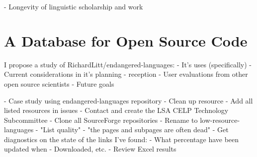 - Longevity of linguistic scholarship and work

\section{A Database for Open Source Code}\label{sec:solutions}

I propose a study of RichardLitt/endangered-languages:
- It's uses (specifically)
- Current considerations in it's planning
- reception
  - User evaluations from other open source scientists
- Future goals


- Case study using endangered-languages repository
  - Clean up resource
    - Add all listed resources in issues
    - Contact and create the LSA CELP Technology Subcommittee
    - Clone all SourceForge repositories
    - Rename to low-resource-languages
    - "List quality"
    - "the pages and subpages are often dead"
  - Get diagnostics on the state of the links I've found:
    - What percentage have been updated when
    - Downloaded, etc.
  - Review Excel results

